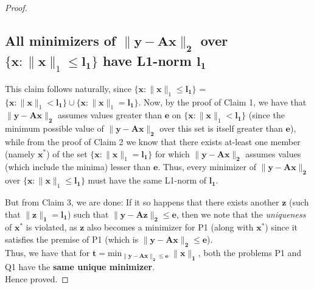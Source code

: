 \documentclass[a4paper,11pt]{article}
\numberwithin{definition}{section}
\numberwithin{mytheorem}{subsection}
\begin{document}
\begin{proof}
\subsection{All minimizers of $\boldsymbol{\lVert y - Ax\rVert_2}$ over $\{\boldsymbol{x}: \lVert\boldsymbol{x}\rVert_1 \leq \boldsymbol{l_1}\}$ have L1-norm $\boldsymbol{l_1}$}
This claim follows naturally, since $\{\boldsymbol{x}: \lVert\boldsymbol{x}\rVert_1 \leq \boldsymbol{l_1}\}$ = $\{\boldsymbol{x}: \lVert\boldsymbol{x}\rVert_1 < \boldsymbol{l_1}\}\cup\{\boldsymbol{x}: \lVert\boldsymbol{x}\rVert_1 = \boldsymbol{l_1}\}$. Now, by the proof of Claim 1, we have that $\boldsymbol{\lVert y - Ax\rVert_2}$ assumes values greater than $\boldsymbol{e}$ on $\{\boldsymbol{x}: \lVert\boldsymbol{x}\rVert_1 < \boldsymbol{l_1}\}$ (since the minimum possible value of $\boldsymbol{\lVert y - Ax\rVert_2}$ over this set is itself greater than $\boldsymbol{e}$), while from the proof of Claim 2 we know that there exists at-least one member (namely $\boldsymbol{x^*}$) of the set $\{\boldsymbol{x}: \lVert\boldsymbol{x}\rVert_1 = \boldsymbol{l_1}\}$ for which $\boldsymbol{\lVert y - Ax\rVert_2}$ assumes values (which include the minima) lesser than $\boldsymbol{e}$. Thus, every minimizer of $\boldsymbol{\lVert y - Ax\rVert_2}$ over $\{\boldsymbol{x}: \lVert\boldsymbol{x}\rVert_1 \leq \boldsymbol{l_1}\}$ must have the same L1-norm of $\boldsymbol{l_1}$.


But from Claim 3, we are done: If it so happens that there exists another $\boldsymbol{z}$ (such that $\boldsymbol{\lVert z\rVert_1 = l_1}$) such that $\boldsymbol{\lVert y - Az\rVert_2 \leq e}$, then we note that the \emph{uniqueness} of $\boldsymbol{x^*}$ is violated, as $\boldsymbol{z}$ also becomes a minimizer for P1 (along with $\boldsymbol{x^*}$) since it satisfies the premise of P1 (which is $\boldsymbol{\lVert y - Ax\rVert_2 \leq e}$).\\
Thus, we have that for $\boldsymbol{t = \mathrm{min}_{\lVert y - Ax\rVert_2 \leq e}\;\lVert x\rVert_1}$, both the problems P1 and Q1 have the \textbf{same unique minimizer}.\\
Hence proved.
\end{proof}

\newpage
\newpage
\end{document}
